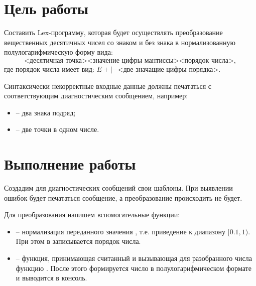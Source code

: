 





\tableofcontents
\newpage

\section{Цель работы}

Составить Lex-программу, которая будет осуществлять преобразование вещественных десятичных чисел со знаком и без знака в нормализованную полулогарифмическую форму вида:
\begin{displaymath}
[+|-]\text{<десятичная точка>}\text{<значение цифры мантиссы>}\text{<порядок числа>},
\end{displaymath}
где порядок числа имеет вид: $E+|-\text{<две значащие цифры порядка>}$.

Синтаксически некорректные входные данные должны печататься с соответствующим диагностическим сообщением, например:

\begin{itemize}
	\item {} -- два знака подряд;
	\item {} -- две точки в одном числе.
\end{itemize}

\section{Выполнение работы}

Создадим для диагностических сообщений свои шаблоны. При выявлении ошибок будет печататься сообщение, а преобразование происходить не будет. 

Для преобразования напишем вспомогательные функции:

\begin{itemize}
	\item {} -- нормализация переданного значения , т.е. приведение к диапазону $[0.1, 1)$. При этом в  записывается порядок числа.
	\item {} -- функция, принимающая считанный  и вызывающая для разобранного числа функцию . После этого формируется число в полулогарифмическом формате и выводится в консоль.
\end{itemize}


